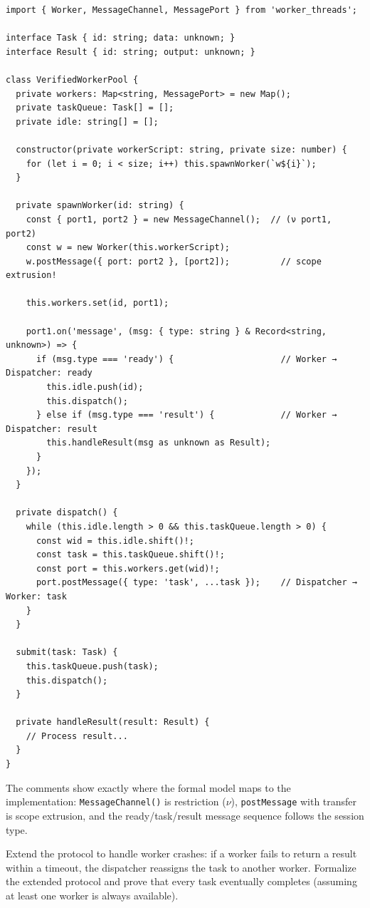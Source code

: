 \documentclass[11pt, a4paper, oneside]{book}
\newcommand{\lc}[1]{\texttt{#1}}
\newcounter{exercise}[chapter]
\begin{document}
\begin{tsbox}
\begin{verbatim}
import { Worker, MessageChannel, MessagePort } from 'worker_threads';

interface Task { id: string; data: unknown; }
interface Result { id: string; output: unknown; }

class VerifiedWorkerPool {
  private workers: Map<string, MessagePort> = new Map();
  private taskQueue: Task[] = [];
  private idle: string[] = [];

  constructor(private workerScript: string, private size: number) {
    for (let i = 0; i < size; i++) this.spawnWorker(`w${i}`);
  }

  private spawnWorker(id: string) {
    const { port1, port2 } = new MessageChannel();  // (ν port1, port2)
    const w = new Worker(this.workerScript);
    w.postMessage({ port: port2 }, [port2]);          // scope extrusion!

    this.workers.set(id, port1);

    port1.on('message', (msg: { type: string } & Record<string, unknown>) => {
      if (msg.type === 'ready') {                     // Worker → Dispatcher: ready
        this.idle.push(id);
        this.dispatch();
      } else if (msg.type === 'result') {             // Worker → Dispatcher: result
        this.handleResult(msg as unknown as Result);
      }
    });
  }

  private dispatch() {
    while (this.idle.length > 0 && this.taskQueue.length > 0) {
      const wid = this.idle.shift()!;
      const task = this.taskQueue.shift()!;
      const port = this.workers.get(wid)!;
      port.postMessage({ type: 'task', ...task });    // Dispatcher → Worker: task
    }
  }

  submit(task: Task) {
    this.taskQueue.push(task);
    this.dispatch();
  }

  private handleResult(result: Result) {
    // Process result...
  }
}
\end{verbatim}
\end{tsbox}

The comments show exactly where the formal model maps to the implementation:
\lc{MessageChannel()} is restriction ($\nu$), \lc{postMessage} with transfer
is scope extrusion, and the ready/task/result message sequence follows the
session type.

\begin{exercisebox}[title={Exercise 12.1}]
Extend the protocol to handle worker crashes: if a worker fails to return a
result within a timeout, the dispatcher reassigns the task to another worker.
Formalize the extended protocol and prove that every task eventually completes
(assuming at least one worker is always available).
\end{exercisebox}
\end{document}
